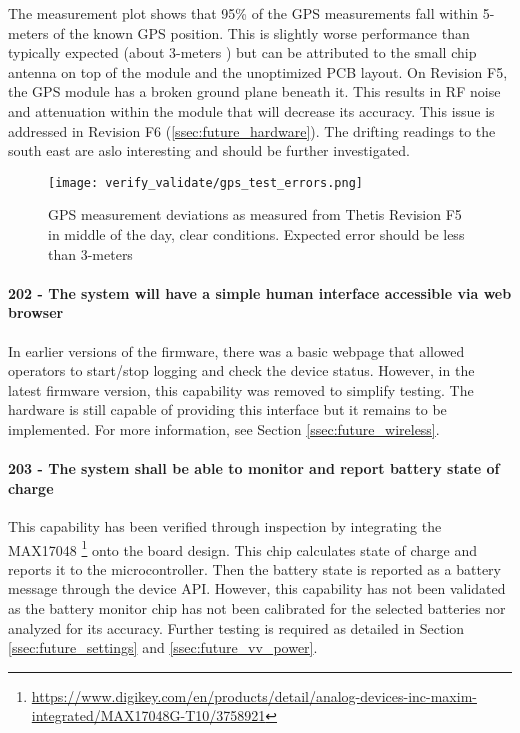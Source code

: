 The measurement plot shows that 95\% of the GPS measurements fall within 5-meters of the known GPS position.
This is slightly worse performance than typically expected (about 3-meters \cite{Hofmann:2001}) but can be attributed to the small chip antenna on top of the module and the unoptimized PCB layout.
On Revision F5, the GPS module has a broken ground plane beneath it.
This results in RF noise and attenuation within the module that will decrease its accuracy.
This issue is addressed in Revision F6 (\ref{ssec:future_hardware}).
The drifting readings to the south east are aslo interesting and should be further investigated.

\begin{figure}[h!]
    \caption{GPS measurement deviations as measured from Thetis Revision F5 in middle of the day, clear conditions.
	Expected error should be less than 3-meters}
    \centering
    \texttt{[image: verify\_validate/gps\_test\_errors.png]}
\end{figure}

\paragraph*{202 - The system will have a simple human interface accessible via web browser} In earlier versions of the firmware, there was a basic webpage that allowed operators to start/stop logging and check the device status.
However, in the latest firmware version, this capability was removed to simplify testing.
The hardware is still capable of providing this interface but it remains to be implemented.
For more information, see Section \ref{ssec:future_wireless}.

\paragraph*{203 - The system shall be able to monitor and report battery state of charge} This capability has been verified through inspection by integrating the MAX17048 \footnote{\url{https://www.digikey.com/en/products/detail/analog-devices-inc-maxim-integrated/MAX17048G-T10/3758921}} onto the board design.
This chip calculates state of charge and reports it to the microcontroller.
Then the battery state is reported as a battery message through the device API.
However, this capability has not been validated as the battery monitor chip has not been calibrated for the selected batteries nor analyzed for its accuracy.
Further testing is required as detailed in Section \ref{ssec:future_settings} and \ref{ssec:future_vv_power}.


